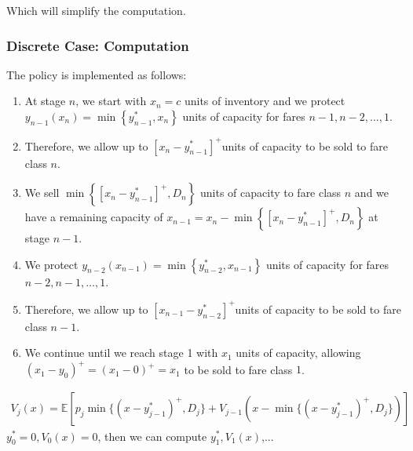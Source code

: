 \documentclass[11pt,a4paper]{article}
\begin{document}
Which will simplify the computation.



\subsubsection{Discrete Case: Computation}

The policy is implemented as follows:
\begin{enumerate}
    \item At stage $n$, we start with $x_{n}=c$ units of inventory and we protect $y_{n-1}\left(x_{n}\right)=\min \left\{y_{n-1}^{*}, x_{n}\right\}$ units of capacity for fares $n-1, n-2, \ldots, 1$.
    \item Therefore, we allow up to $\left[x_{n}-y_{n-1}^{*}\right]^{+}$units of capacity to be sold to fare class $n$.
    \item We sell $\min \left\{\left[x_{n}-y_{n-1}^{*}\right]^{+}, D_{n}\right\}$ units of capacity to fare class $n$ and we have a remaining capacity of $x_{n-1}=x_{n}-\min \left\{\left[x_{n}-y_{n-1}^{*}\right]^{+}, D_{n}\right\}$ at stage $n-1$.
    \item We protect $y_{n-2}\left(x_{n-1}\right)=\min \left\{y_{n-2}^{*}, x_{n-1}\right\}$ units of capacity for fares $n-2, n-1, \ldots, 1$.
    \item Therefore, we allow up to $\left[x_{n-1}-y_{n-2}^{*}\right]^{+}$units of capacity to be sold to fare class $n-1$.
    \item We continue until we reach stage 1 with $x_{1}$ units of capacity, allowing $\left(x_{1}-y_{0}\right)^{+}=\left(x_{1}-0\right)^{+}=x_{1}$ to be sold to fare class $1$.
\end{enumerate}

\begin{equation}
    \begin{aligned}
        V_j(x)=\mathbb{E}[p_j\min\{(x-y_{j-1}^*)^+, D_j\}+V_{j-1}(x-\min\{(x-y_{j-1}^*)^+, D_j\})]
    \end{aligned}
    \nonumber
\end{equation}
$y_0^*=0, V_0(x)=0$, then we can compute $y_1^*,V_1(x)$,...
\end{document}
